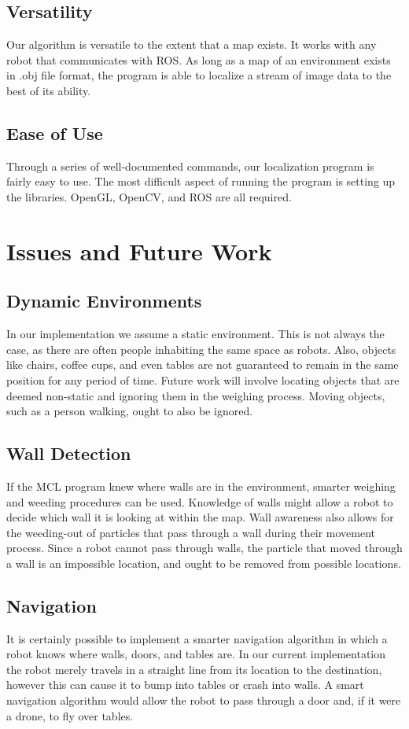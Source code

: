 \documentclass[a4paper,11pt]{article}
\begin{document}
\subsection{Versatility}
Our algorithm is versatile to the extent that a map exists. It works with any robot that communicates with ROS. As long as a map of an environment exists in .obj file format, the program is able to localize a stream of image data to the best of its ability.

\subsection{Ease of Use}
Through a series of well-documented commands, our localization program is fairly easy to use. The most difficult aspect of running the program is setting up the libraries. OpenGL, OpenCV, and ROS are all required.

\section{Issues and Future Work}
\subsection{Dynamic Environments}
In our implementation we assume a static environment. This is not always the case, as there are often people inhabiting the same space as robots. Also, objects like chairs, coffee cups, and even tables are not guaranteed to remain in the same position for any period of time. Future work will involve locating objects that are deemed non-static and ignoring them in the weighing process. Moving objects, such as a person walking, ought to also be ignored.

\subsection{Wall Detection}
If the MCL program knew where walls are in the environment, smarter weighing and weeding procedures can be used. Knowledge of walls might allow a robot to decide which wall it is looking at within the map. Wall awareness also allows for the weeding-out of particles that pass through a wall during their movement process. Since a robot cannot pass through walls, the particle that moved through a wall is an impossible location, and ought to be removed from possible locations.

\subsection{Navigation}
It is certainly possible to implement a smarter navigation algorithm in which a robot knows where walls, doors, and tables are. In our current implementation the robot merely travels in a straight line from its location to the destination, however this can cause it to bump into tables or crash into walls. A smart navigation algorithm would allow the robot to pass through a door and, if it were a drone, to fly over tables.
\end{document}
